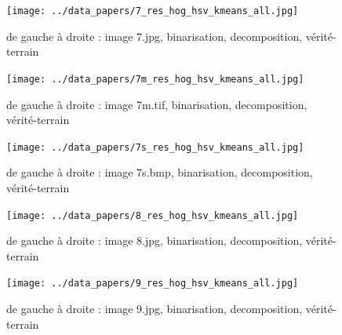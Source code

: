 \documentclass{book}
\begin{document}
\begin{figure}[H]
\begin{center}
\texttt{[image: ../data\_papers/7\_res\_hog\_hsv\_kmeans\_all.jpg]}
\end{center}
\caption{de gauche à droite : image 7.jpg, binarisation, decomposition, vérité-terrain}
\label{7}
\end{figure}
\clearpage


\begin{figure}[H]
\begin{center}
\texttt{[image: ../data\_papers/7m\_res\_hog\_hsv\_kmeans\_all.jpg]}
\end{center}
\caption{de gauche à droite : image 7m.tif, binarisation, decomposition, vérité-terrain}
\label{7m}
\end{figure}
\clearpage


\begin{figure}[H]
\begin{center}
\texttt{[image: ../data\_papers/7s\_res\_hog\_hsv\_kmeans\_all.jpg]}
\end{center}
\caption{de gauche à droite : image 7s.bmp, binarisation, decomposition, vérité-terrain}
\label{7s}
\end{figure}
\clearpage


\begin{figure}[H]
\begin{center}
\texttt{[image: ../data\_papers/8\_res\_hog\_hsv\_kmeans\_all.jpg]}
\end{center}
\caption{de gauche à droite : image 8.jpg, binarisation, decomposition, vérité-terrain}
\label{8}
\end{figure}
\clearpage


\begin{figure}[H]
\begin{center}
\texttt{[image: ../data\_papers/9\_res\_hog\_hsv\_kmeans\_all.jpg]}
\end{center}
\caption{de gauche à droite : image 9.jpg, binarisation, decomposition, vérité-terrain}
\label{9}
\end{figure}
\clearpage


\clearpage

\backmatter

\listoftables

\listoffigures



\end{document}
